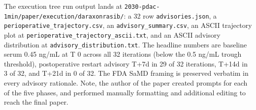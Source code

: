 The execution tree run output lands at
\texttt{2030-pdac-1min/paper/execution/daraxonrasib/}: a 32 row
\texttt{advisories.json}, a \texttt{perioperative_trajectory.csv},
an \texttt{advisory_summary.csv}, an ASCII trajectory plot at
\texttt{perioperative_trajectory_ascii.txt}, and an ASCII advisory
distribution at \texttt{advisory_distribution.txt}. The headline
numbers are baseline serum 0.45 ng/mL at T 0 across all 32
iterations (below the 0.5 ng/mL trough threshold), postoperative
restart advisory T+7d in 29 of 32 iterations, T+14d in 3 of 32,
and T+21d in 0 of 32. The FDA SaMD \cite{fda-samd} framing is
preserved verbatim in every advisory rationale. Note, the author of the paper created prompts for each of the five phases, and performed manually formatting and additional editing to reach the final paper.

